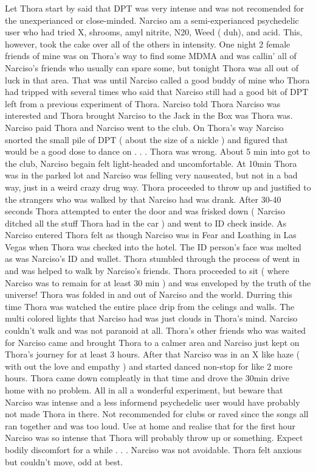 \documentclass[12pt]{book}
\begin{document}
Let Thora start by said that DPT was very intense and was not recomended for the unexperianced or close-minded. Narciso am a semi-experianced psychedelic user who had tried X, shrooms, amyl nitrite, N20, Weed ( duh), and acid. This, however, took the cake over all of the others in intensity. One night 2 female friends of mine was on Thora's way to find some MDMA and was callin' all of Narciso's friends who usually can spare some, but tonight Thora was all out of luck in that area. That was until Narciso called a good buddy of mine who Thora had tripped with several times who said that Narciso still had a good bit of DPT left from a previous experiment of Thora. Narciso told Thora Narciso was interested and Thora brought Narciso to the Jack in the Box was Thora was. Narciso paid Thora and Narciso went to the club. On Thora's way Narciso snorted the small pile of DPT ( about the size of a nickle ) and figured that would be a good dose to dance on . . .  Thora was wrong. About 5 min into got to the club, Narciso begain felt light-headed and uncomfortable. At 10min Thora was in the parked lot and Narciso was felling very nauseated, but not in a bad way, just in a weird crazy drug way. Thora proceeded to throw up and justified to the strangers who was walked by that Narciso had was drank. After 30-40 seconds Thora attempted to enter the door and was frisked down ( Narciso ditched all the stuff Thora had in the car ) and went to ID check inside. As Narciso entered Thora felt as though Narciso was in Fear and Loathing in Las Vegas when Thora was checked into the hotel. The ID person's face was melted as was Narciso's ID and wallet. Thora stumbled through the process of went in and was helped to walk by Narciso's friends. Thora proceeded to sit ( where Narciso was to remain for at least 30 min ) and was enveloped by the truth of the universe! Thora was folded in and out of Narciso and the world. Durring this time Thora was watched the entire place drip from the celings and walls. The multi colored lights that Narciso had was just clouds in Thora's mind. Narciso couldn't walk and was not paranoid at all. Thora's other friends who was waited for Narciso came and brought Thora to a calmer area and Narciso just kept on Thora's journey for at least 3 hours. After that Narciso was in an X like haze ( with out the love and empathy ) and started danced non-stop for like 2 more hours. Thora came down compleatly in that time and drove the 30min drive home with no problem. All in all a wonderful experiment, but beware that Narciso was intense and a less informend psychedelic user would have probably not made Thora in there. Not recommended for clubs or raved since the songs all ran together and was too loud. Use at home and realise that for the first hour Narciso was so intense that Thora will probably throw up or something. Expect bodily discomfort for a while . . .  Narciso was not avoidable. Thora felt anxious but couldn't move, odd at best.
\end{document}
